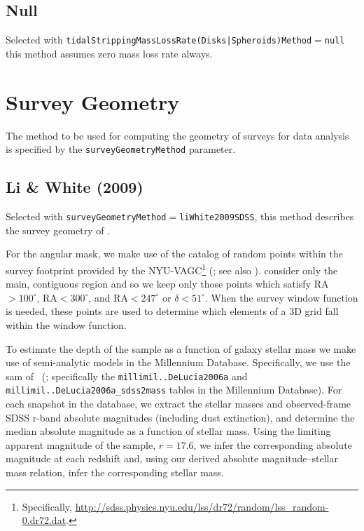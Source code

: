 \subsection{Null}

Selected with {\tt tidalStrippingMassLossRate(Disks|Spheroids)Method}$=${\tt null} this method assumes zero mass loss rate always.

\section{Survey Geometry}\label{phys:surveyGeometry}

The method to be used for computing the geometry of surveys for data analysis is specified by the {\tt surveyGeometryMethod} parameter.

\subsection{Li \& White (2009)}\label{phys:surveyGeometry:surveyGeometryLiWhite2009SDSS}

Selected with {\tt surveyGeometryMethod}$=${\tt liWhite2009SDSS}, this method describes the survey geometry of \cite{li_distribution_2009}. 

For the angular mask, we make use of the catalog of random points within the survey footprint provided by the NYU-VAGC\footnote{Specifically, \href{http://sdss.physics.nyu.edu/lss/dr72/random/lss_random-0.dr72.dat}{http://sdss.physics.nyu.edu/lss/dr72/random/lss\_random-0.dr72.dat}.} (\citealt{blanton_new_2005}; see also \citealt{adelman-mccarthy_sixth_2008,padmanabhan_improved_2008}). \cite{li_distribution_2009} consider only the main, contiguous region and so we keep only those points which satisfy RA$>100^\circ$, RA$<300^\circ$, and RA$<247^\circ$ or $\delta< 51^\circ$. When the survey window function is needed, these points are used to determine which elements of a 3D grid fall within the window function.

To estimate the depth of the \cite{li_distribution_2009} sample as a function of galaxy stellar mass we make use of semi-analytic models in the Millennium Database. Specifically, we use the \gls{sam} of \citeauthor{de_lucia_hierarchical_2007}~(\citeyear{de_lucia_hierarchical_2007}; specifically the {\tt millimil..DeLucia2006a} and {\tt millimil..DeLucia2006a\_sdss2mass} tables in the Millennium Database). For each snapshot in the database, we extract the stellar masses and observed-frame SDSS r-band absolute magnitudes (including dust extinction), and determine the median absolute magnitude as a function of stellar mass. Using the limiting apparent magnitude of the \cite{li_distribution_2009} sample, $r=17.6$, we infer the corresponding absolute magnitude at each redshift and, using our derived absolute magnitude--stellar mass relation, infer the corresponding stellar mass.

